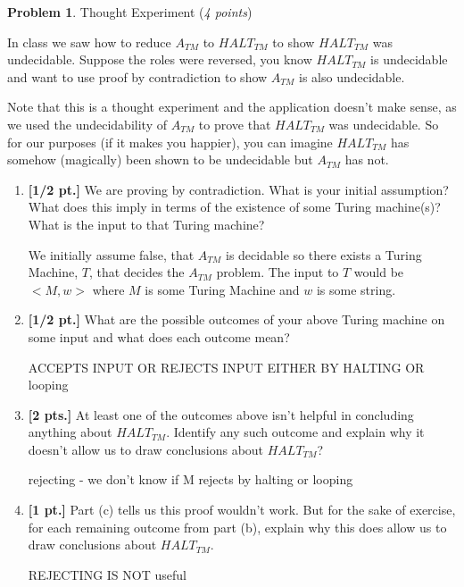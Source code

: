 \documentclass[11pt]{article}
\theoremstyle{definition}
\theoremstyle{theorem}
\newtheorem{prob}{Problem}
\newcommand{\solution}{\medskip\noindent{\color{blue}\textbf{Solution:}}}
\begin{document}
\newpage

\begin{prob} Thought Experiment (\emph{4 points})\end{prob}

In class we saw how to reduce $A_{TM}$ to $HALT_{TM}$ to show $HALT_{TM}$ was undecidable. Suppose the roles were reversed, you know $HALT_{TM}$ is undecidable and want to use proof by contradiction to show $A_{TM}$ is also undecidable.

Note that this is a thought experiment and the application doesn't make sense, as we used the undecidability of $A_{TM}$ to prove that $HALT_{TM}$ was undecidable. So for our purposes (if it makes you happier), you can imagine $HALT_{TM}$ has somehow (magically) been shown to be undecidable but $A_{TM}$ has not.

\begin{enumerate}[label=(\alph*)]


\item \textbf{[1/2 pt.]} We are proving by contradiction. What is your initial assumption? What does this imply in terms of the existence of some Turing machine(s)? What is the input to that Turing machine?

\solution

We initially assume false, that $A_{TM}$ is decidable so there exists a Turing Machine, $T$, that decides the $A_{TM}$ problem. The input to $T$ would be $<M, w>$ where $M$ is some Turing Machine and $w$ is some string. 


\item \textbf{[1/2 pt.]} What are the possible outcomes of your above Turing machine on some input and what does each outcome mean?

\solution

ACCEPTS INPUT OR REJECTS INPUT EITHER BY HALTING OR looping



\item \textbf{[2 pts.]} At least one of the outcomes above isn't helpful in concluding anything about $HALT_{TM}$. Identify any such outcome and explain why it doesn't  allow us to draw conclusions about $HALT_{TM}$?

\solution

rejecting - we don't know if M rejects by halting or looping


\item \textbf{[1 pt.]} Part (c) tells us this proof wouldn't work. But for the sake of exercise, for each remaining outcome from part (b), explain why this does allow us to draw conclusions about $HALT_{TM}$.

\solution


REJECTING IS NOT useful


\end{enumerate}
\end{document}
